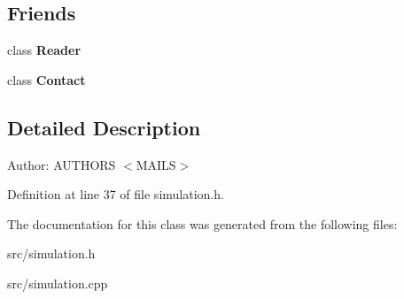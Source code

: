 \subsection*{Friends}
\begin{CompactItemize}
\item 
\hypertarget{classmknix_1_1Simulation_35cb182752752c74a30050705acc3c06}{
class \textbf{Reader}}
\label{classmknix_1_1Simulation_35cb182752752c74a30050705acc3c06}

\item 
\hypertarget{classmknix_1_1Simulation_76d4b1c8c6040df20040808941b7e764}{
class \textbf{Contact}}
\label{classmknix_1_1Simulation_76d4b1c8c6040df20040808941b7e764}

\end{CompactItemize}


\subsection{Detailed Description}
\begin{Desc}
\item[Author:]AUTHORS $<$MAILS$>$ \end{Desc}


Definition at line 37 of file simulation.h.

The documentation for this class was generated from the following files:\begin{CompactItemize}
\item 
src/simulation.h\item 
src/simulation.cpp\end{CompactItemize}

